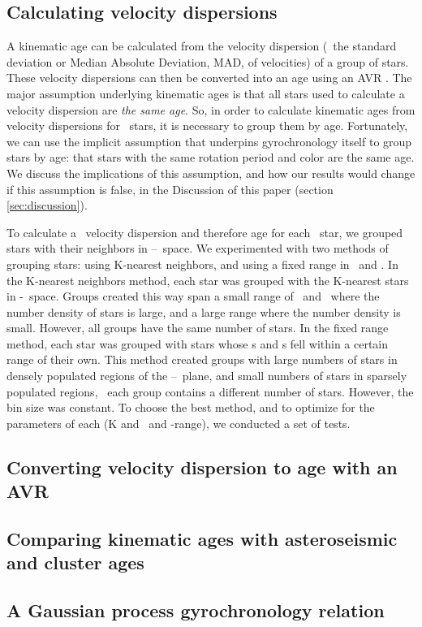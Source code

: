 \subsection{Calculating velocity dispersions}
A kinematic age can be calculated from the velocity dispersion (\eg\ the
standard deviation or Median Absolute Deviation, MAD, of velocities) of a
group of stars.
These velocity dispersions can then be converted into an age using an AVR
\citep[\eg][]{holberg2009, yu2019}.
The major assumption underlying kinematic ages is that all stars used to
calculate a velocity dispersion are {\it the same age}.
So, in order to calculate kinematic ages from velocity dispersions for
\kepler\ stars, it is necessary to group them by age.
Fortunately, we can use the implicit assumption that underpins gyrochronology
itself to group stars by age: that stars with the same rotation period and
color are the same age.
We discuss the implications of this assumption, and how our results would
change if this assumption is false, in the Discussion of this paper (section
\ref{sec:discussion}).

To calculate a \vz\ velocity dispersion and therefore age for each \kepler\
star, we grouped stars with their neighbors in
\logp--\teff\ space.
We experimented with two methods of grouping stars: using K-nearest neighbors,
and using a fixed range in \logp\ and \teff.
In the K-nearest neighbors method, each star was grouped with the K-nearest
stars in \logp-\teff\ space.
Groups created this way span a small range of \logp\ and \teff\ where the
number density of stars is large, and a large range where the number density
is small.
However, all groups have the same number of stars.
In the fixed range method, each star was grouped with stars whose \logp s and
\teff s fell within a certain range of their own.
This method created groups with large numbers of stars in densely populated
regions of the \logp--\teff\ plane, and small numbers of stars in sparsely
populated regions, \ie\ each group contains a different number of stars.
However, the bin size was constant.
To choose the best method, and to optimize for the parameters of each (K and
\logp\ and \teff-range), we conducted a set of tests.


\subsection{Converting velocity dispersion to age with an AVR}

\subsection{Comparing kinematic ages with asteroseismic and cluster ages}

\subsection{A Gaussian process gyrochronology relation}
